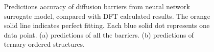 \begingroup
\begin{figure}[!ht]
  \centering
\caption[Predictions accuracy of diffusion barriers from neural network surrogate model, compared with DFT calculated results.]{Predictions accuracy of diffusion barriers from neural network surrogate model, compared with DFT calculated results. The orange solid line indicates perfect fitting. Each blue solid dot represents one data point. (a) predictions of all the barriers. (b) predictions of ternary ordered structures.}
\label{Chap:Al/Vac:fig:fitting_all}
\end{figure}
\endgroup


